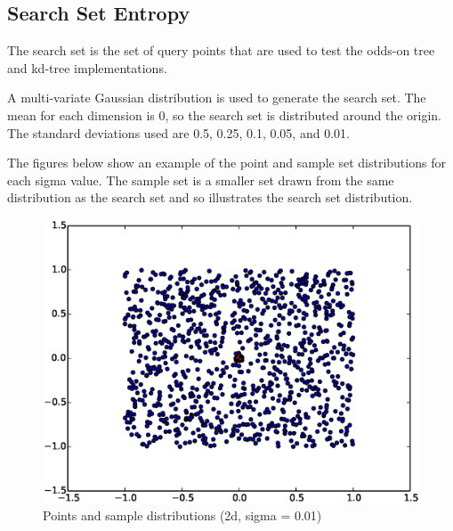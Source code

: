 \documentclass[mcs]{scsthesis}
\begin{document}
\subsection{Search Set Entropy}

The search set is the set of query points that are used to test the odds-on
tree and kd-tree implementations.

A multi-variate Gaussian distribution is used to generate the search set. The
mean for each dimension is 0, so the search set is distributed around the
origin. The standard deviations used are 0.5, 0.25, 0.1, 0.05, and 0.01.

The figures below show an example of the point and sample set distributions for
each sigma value. The sample set is a smaller set drawn from the same
distribution as the search set and so illustrates the search set distribution.

\begin{figure}
\begin{center}
\includegraphics[scale=0.5]{diagrams/pts_plot_sigma0.01.eps}
\caption{Points and sample distributions (2d, sigma = 0.01)}
\label{fig:points_and_sample_2d_0_01}
\end{center}
\end{figure}
\end{document}

